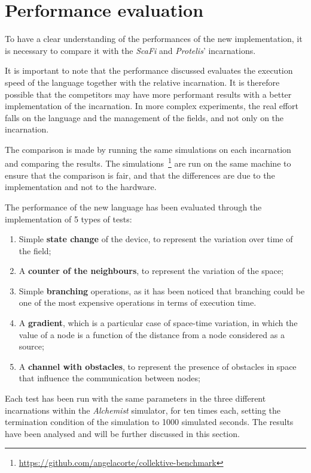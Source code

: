 \section{Performance evaluation}
\label{sec:performance-evaluation}
To have a clear understanding of the performances of the new implementation, it is necessary to compare it with the
\emph{ScaFi} and \emph{Protelis}' incarnations.

It is important to note that the performance discussed evaluates the execution speed of the language together with
the relative incarnation.
It is therefore possible that the competitors may have more performant results with a better implementation of the incarnation.
In more complex experiments, the real effort falls on the language and the management of the fields, and not only on the incarnation.

The comparison is made by running the same simulations on each incarnation and comparing the results.
The simulations~\footnote{\url{https://github.com/angelacorte/collektive-benchmark}} are run on the same machine to
ensure that the comparison is fair, and that the differences are due to the implementation and not to the hardware.

The performance of the new language has been evaluated through the implementation of 5 types of tests:
\begin{enumerate}
    \item Simple \textbf{state change} of the device, to represent the variation over time of the field;
    \item A \textbf{counter of the neighbours}, to represent the variation of the space;
    \item Simple \textbf{branching} operations, as it has been noticed that branching could be one of the most expensive operations in terms of execution time.
    \item A \textbf{gradient}, which is a particular case of space-time variation, in which the value of a node is a
        function of the distance from a node considered as a source;
    \item A \textbf{channel with obstacles}, to represent the presence of obstacles in space that influence the communication between nodes;
\end{enumerate}

Each test has been run with the same parameters in the three different incarnations within the \emph{Alchemist} simulator,
for ten times each, setting the termination condition of the simulation to 1000 simulated seconds.
The results have been analysed and will be further discussed in this section.

